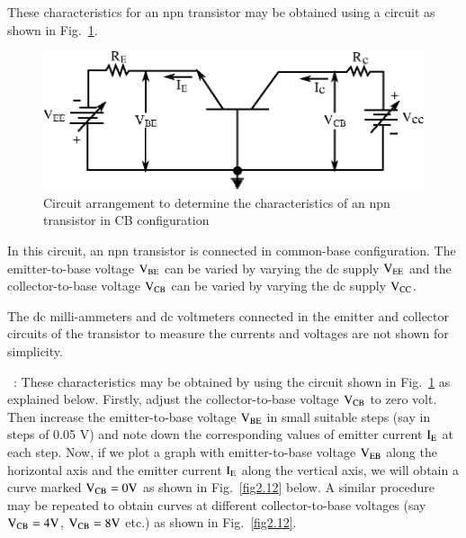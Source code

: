 These characteristics for an npn transistor may be obtained using a circuit as shown in Fig.~\ref{fig2.11}.
\begin{figure}[H]
\centering
\includegraphics{chap2/fig11.eps}
\caption{Circuit arrangement to determine the characteristics of an npn transistor in CB configuration}\label{fig2.11}
\end{figure}

In this circuit, an npn transistor is connected in common-base configuration. The emitter-to-base voltage $\textrm{V}_{\text{BE}}$ can be varied by varying the dc supply $\textrm{V}_{\text{EE}}$ and the collector-to-base voltage $\textrm{V}_{\text{CB}}$ can be varied by varying the dc supply $\textrm{V}_{\text{CC}}$. 

The dc milli-ammeters and dc voltmeters connected in the emitter and collector circuits of the transistor to measure the currents and voltages are not shown for simplicity.

~: These characteristics may be obtained by using the circuit shown in Fig.~\ref{fig2.11} as explained below. Firstly, adjust the collector-to-base voltage $\textrm{V}_{\text{CB}}$ to zero volt. Then increase the emitter-to-base voltage $\textrm{V}_{\text{BE}}$ in small suitable steps (say in steps of 0.05 V) and note down the corresponding values of emitter current $\textrm{I}_{\textrm{E}}$ at each step. Now, if we plot a graph with emitter-to-base voltage $\textrm{V}_{\text{EB}}$ along the horizontal axis and the emitter current $\textrm{I}_{\textrm{E}}$ along the vertical axis, we will obtain a curve marked $\textrm{V}_{\text{CB}}=0\textrm{V}$ as shown in Fig.~\ref{fig2.12} below. A similar procedure may be repeated to obtain curves at different collector-to-base voltages (say $\textrm{V}_{\text{CB}}=4\textrm{V}$, $\textrm{V}_{\text{CB}}=8\textrm{V}$ etc.) as shown in Fig.~\ref{fig2.12}.

